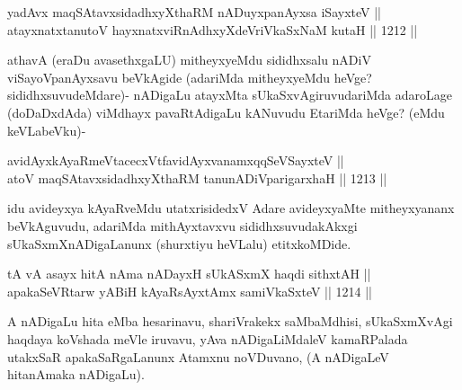 
\begin{shl}
yadAvx maqSAtavxsidadhxyXthaRM nADuyxpanAyxsa iSayxteV || \\
atayxnatxtanutoV hayxnatxviRnAdhxyXdeVriVkaSxNaM kutaH \hfill || 1212 ||  
\end{shl}

\begin{artha}
athavA (eraDu avasethxgaLU) mitheyxyeMdu sididhxsalu nADiV viSayoVpanAyxsavu beVkAgide (adariMda mitheyxyeMdu heVge? sididhxsuvudeMdare)- nADigaLu atayxMta sUkaSxvAgiruvudariMda adaroLage (doDaDxdAda) viMdhayx pavaRtAdigaLu kANuvudu EtariMda heVge? (eMdu keVLabeVku)-
\end{artha}

\begin{shl}
avidAyxkAyaRmeVtacecxVtf\footnotemark[1] avidAyxvanamxqqSeVSayxteV || \\
atoV maqSAtavxsidadhxyXthaRM tanunADiVparigarxhaH \hfill || 1213 ||  
\end{shl}

\begin{artha}
idu avideyxya kAyaRveMdu utatxrisidedxV Adare avideyxyaMte mitheyxyananx beVkAguvudu, adariMda mithAyxtavxvu sididhxsuvudakAkxgi sUkaSxmXnADigaLanunx (shurxtiyu heVLalu) etitxkoMDide.
\end{artha}


\begin{shl}
tA vA asayx hitA nAma nADayxH sUkASxmX haqdi sithxtAH || \\
apakaSeVRtarw yABiH kAyaRsAyx\s \s tAmx samiVkaSxteV \hfill || 1214 ||  
\end{shl}

\begin{artha}
A nADigaLu hita eMba hesarinavu, shariVrakekx saMbaMdhisi, sUkaSxmXvAgi haqdaya koVshada meVle iruvavu, yAva nADigaLiMdaleV kamaRPalada utakxSaR apakaSaRgaLanunx Atamxnu noVDuvano, (A nADigaLeV hitanAmaka nADigaLu).
\end{artha}

